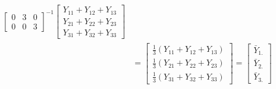 \documentclass{article}
\begin{document}
\begin{enumerate}[leftmargin = 0 em, label = \arabic*., font = \bfseries]
\begin{enumerate}
\begin{align*}
{\begin{bmatrix}
			0&3&0\\
			0&0&3
		\end{bmatrix}}^{-1}
		\begin{bmatrix}
			Y_{11} + Y_{12} + Y_{13}\\
			Y_{21} + Y_{22} + Y_{23}\\
			Y_{31} + Y_{32} + Y_{33}
		\end{bmatrix}
		\\
		& = \begin{bmatrix}
			\frac{1}{3} (Y_{11} + Y_{12} + Y_{13})\\
			\frac{1}{3} (Y_{21} + Y_{22} + Y_{23})\\
			\frac{1}{3} (Y_{31} + Y_{32} + Y_{33})
		\end{bmatrix}
		=
		\begin{bmatrix}
			\bar{Y}_{1.}\\
			\bar{Y}_{2.}\\
			\bar{Y}_{3.}
		\end{bmatrix}
		\end{align*}



\end{enumerate}
\end{enumerate}
\end{document}
